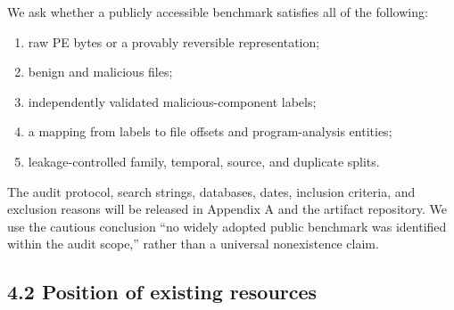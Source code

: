 \documentclass[
  10pt,
]{article}
\providecommand{\tightlist}{%
  \setlength{\itemsep}{0pt}\setlength{\parskip}{0pt}}
\begin{document}
We ask whether a publicly accessible benchmark satisfies all of the
following:

\begin{enumerate}
\def\labelenumi{\arabic{enumi}.}
\tightlist
\item
  raw PE bytes or a provably reversible representation;
\item
  benign and malicious files;
\item
  independently validated malicious-component labels;
\item
  a mapping from labels to file offsets and program-analysis entities;
\item
  leakage-controlled family, temporal, source, and duplicate splits.
\end{enumerate}

The audit protocol, search strings, databases, dates, inclusion
criteria, and exclusion reasons will be released in Appendix A and the
artifact repository. We use the cautious conclusion ``no widely adopted
public benchmark was identified within the audit scope,'' rather than a
universal nonexistence claim.

\subsection{4.2 Position of existing
resources}\label{position-of-existing-resources}
\end{document}
